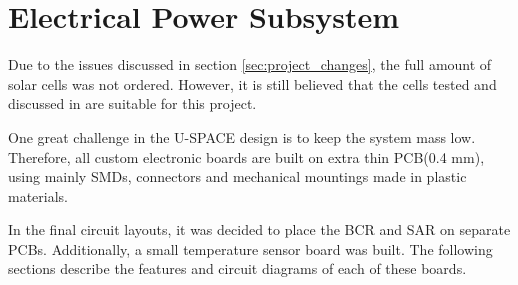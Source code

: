 \section{Electrical Power Subsystem}
%
Due to the issues discussed in section \ref{sec:project_changes}, the full amount of solar cells was not ordered. However, it is still believed that the cells tested and discussed in \cite{CDR} are suitable for this project.

One great challenge in the U-SPACE design is to keep the system mass low. Therefore, all custom electronic boards are built on extra thin \ac{PCB}(0.4 mm), using mainly \acp{SMD}, connectors and mechanical mountings made in plastic materials.

In the final circuit layouts, it was decided to place the \ac{BCR} and \ac{SAR} on separate \acp{PCB}. Additionally, a small temperature sensor board was built. The following sections describe the features and circuit diagrams of each of these boards.
%
%
%
